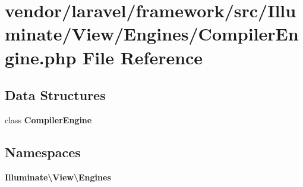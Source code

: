 \section{vendor/laravel/framework/src/\+Illuminate/\+View/\+Engines/\+Compiler\+Engine.php File Reference}
\label{_compiler_engine_8php}
\subsection*{Data Structures}
\begin{DoxyCompactItemize}
\item 
class {\bf Compiler\+Engine}
\end{DoxyCompactItemize}
\subsection*{Namespaces}
\begin{DoxyCompactItemize}
\item 
 {\bf Illuminate\textbackslash{}\+View\textbackslash{}\+Engines}
\end{DoxyCompactItemize}
